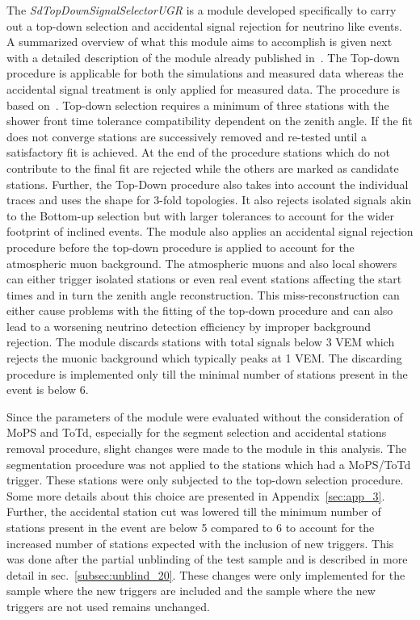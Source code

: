The \textit{SdTopDownSignalSelectorUGR} is a module developed specifically to carry out a top-down selection and accidental signal rejection for neutrino like events. A summarized overview of what this module aims to accomplish is given next with a detailed description of the module already published in~\cite{gap_top_down_module}. The Top-down procedure is applicable for both the simulations and measured data whereas the accidental signal treatment is only applied for measured data. The procedure is based on~\cite{gap_top_down_proc}. Top-down selection requires a minimum of three stations with the shower front time tolerance compatibility dependent on the zenith angle. If the fit does not converge stations are successively removed and re-tested until a satisfactory fit is achieved. At the end of the procedure stations which do not contribute to the final fit are rejected while the others are marked as candidate stations. Further, the Top-Down procedure also takes into account the individual traces and uses the shape for 3-fold topologies. It also rejects isolated signals akin to the Bottom-up selection but with larger tolerances to account for the wider footprint of inclined events. The module also applies an accidental signal rejection procedure before the top-down procedure is applied to account for the atmospheric muon background. The atmospheric muons and also local showers can either trigger isolated stations or even real event stations affecting the start times and in turn the zenith angle reconstruction. This miss-reconstruction can either cause problems with the fitting of the top-down procedure and can also lead to a worsening neutrino detection efficiency by improper background rejection. The module discards stations with total signals below 3 VEM which rejects the muonic background which typically peaks at 1 VEM. The discarding procedure is implemented only till the minimal number of stations present in the event is below 6.

Since the parameters of the module were evaluated without the consideration of MoPS and ToTd, especially for the segment selection and accidental stations removal procedure, slight changes were made to the module in this analysis. The segmentation procedure was not applied to the stations which had a MoPS/ToTd trigger. These stations were only subjected to the top-down selection procedure. Some more details about this choice are presented in Appendix~\ref{sec:app_3}. Further, the accidental station cut was lowered till the minimum number of stations present in the event are below 5 compared to 6 to account for the increased number of stations expected with the inclusion of new triggers. This was done after the partial unblinding of the test sample and is described in more detail in sec.~\ref{subsec:unblind_20}. These changes were only implemented for the sample where the new triggers are included and the sample where the new triggers are not used remains unchanged. 

